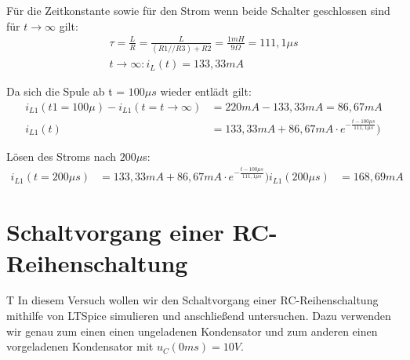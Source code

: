\documentclass{article}
\begin{document}
Für die Zeitkonstante sowie für den Strom wenn beide Schalter geschlossen sind für $t \rightarrow \infty$ gilt:
\begin{align*}
  \tau = \frac{L}{R} = \frac{L}{(R1//R3)+R2} = \frac{1mH}{9\Omega} = 111,1\mu s\\
  t\rightarrow\infty : i_L(t) = 133,33mA
\end{align*}

Da sich die Spule ab t = $100\mu s$ wieder entlädt gilt:
\begin{align*}
  i_{L1}(t1=100\mu) - i_{L1}(t=t\rightarrow \infty) &= 220mA - 133,33mA = 86,67mA\\
  i_{L1}(t) &= 133,33mA + 86,67mA\cdot e^{-\frac{t-100\mu s}{111,1\mu s}})
\end{align*}


Lösen des Stroms nach $200\mu$s:
\begin{align*}
  i_{L1}(t=200\mu s) &= 133,33mA + 86,67mA\cdot e^{-\frac{t-100\mu s}{111,1\mu s}})
  i_{L1}(200\mu s) &= 168,69mA
\end{align*}

\newpage

\section{Schaltvorgang einer RC-Reihenschaltung}

\begin{task}
  T
  In diesem Versuch wollen wir den Schaltvorgang einer RC-Reihenschaltung mithilfe von LTSpice simulieren und anschließend untersuchen. Dazu verwenden wir genau zum einen einen ungeladenen Kondensator und zum anderen einen vorgeladenen Kondensator mit $u_{C}(0ms) = 10V$.
\end{task}
\end{document}
